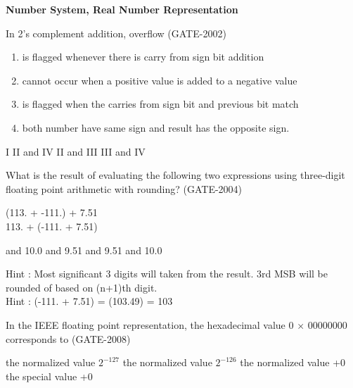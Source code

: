 
\centerline{\textbf{ \LARGE Number System, Real Number Representation}}

\begin{questyle}
    \question  In 2's complement addition, overflow  (GATE-2002)
    \begin{enumerate}
        \item is flagged whenever there is carry from sign bit addition
        \item cannot occur when a positive value is added to a negative value
        \item is flagged when the carries from sign bit and previous bit match
        \item both number have same sign and result has the opposite sign.
    \end{enumerate}

  \begin{oneparchoices}
    \choice         I
    \CorrectChoice  II and IV
    \choice         II and III
    \choice         III and IV
  \end{oneparchoices}
\end{questyle}

\begin{questyle}
  \question  What is the result of evaluating the following two expressions using three-digit
             floating point arithmetic with rounding?  (GATE-2004)

             (113. + -111.) + 7.51 \\
             113. + (-111. + 7.51) \\
  \begin{oneparchoices}
     and 10.0
     and 9.51
     and 9.51
     and 10.0
  \end{oneparchoices}

  Hint : Most significant 3 digits will taken from the result. 3rd MSB will be rounded of based on (n+1)th digit.\\
  Hint : (-111. + 7.51) = (103.49) = 103

\end{questyle}

\begin{questyle}
  \question  In the IEEE floating point representation, the hexadecimal value 0 × 00000000 corresponds to  (GATE-2008)

  \begin{choices}
    \choice         the normalized value \(2^{-127}\)
    \choice         the normalized value \(2^{-126}\)
    \choice         the normalized value +0
    \CorrectChoice  the special value +0
  \end{choices}
\end{questyle}


